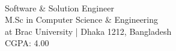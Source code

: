 
\begin{large}
    \\
\end{large}
Software \& Solution Engineer\\
M.Sc in Computer Science $\&$  Engineering\\
at Brac University | Dhaka 1212, Bangladesh \\
CGPA: 4.00
\vspace{0.1cm}